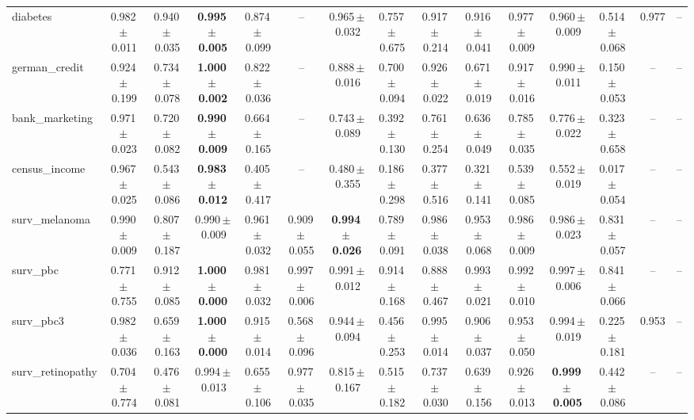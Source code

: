 \documentclass[8pt]{extarticle}
\begin{document}
\begin{longtable}{l*{14}{c}}
diabetes & 0.982\,$\pm$\,0.011 & 0.940\,$\pm$\,0.035 & \textbf{0.995\,$\pm$\,0.005} & 0.874\,$\pm$\,0.099 & -- & 0.965\,$\pm$\,0.032 & 0.757\,$\pm$\,0.675 & 0.917\,$\pm$\,0.214 & 0.916\,$\pm$\,0.041 & 0.977\,$\pm$\,0.009 & 0.960\,$\pm$\,0.009 & 0.514\,$\pm$\,0.068 & 0.977 & -- \\
german\_credit & 0.924\,$\pm$\,0.199 & 0.734\,$\pm$\,0.078 & \textbf{1.000\,$\pm$\,0.002} & 0.822\,$\pm$\,0.036 & -- & 0.888\,$\pm$\,0.016 & 0.700\,$\pm$\,0.094 & 0.926\,$\pm$\,0.022 & 0.671\,$\pm$\,0.019 & 0.917\,$\pm$\,0.016 & 0.990\,$\pm$\,0.011 & 0.150\,$\pm$\,0.053 & -- & -- \\
bank\_marketing & 0.971\,$\pm$\,0.023 & 0.720\,$\pm$\,0.082 & \textbf{0.990\,$\pm$\,0.009} & 0.664\,$\pm$\,0.165 & -- & 0.743\,$\pm$\,0.089 & 0.392\,$\pm$\,0.130 & 0.761\,$\pm$\,0.254 & 0.636\,$\pm$\,0.049 & 0.785\,$\pm$\,0.035 & 0.776\,$\pm$\,0.022 & 0.323\,$\pm$\,0.658 & -- & -- \\
census\_income & 0.967\,$\pm$\,0.025 & 0.543\,$\pm$\,0.086 & \textbf{0.983\,$\pm$\,0.012} & 0.405\,$\pm$\,0.417 & -- & 0.480\,$\pm$\,0.355 & 0.186\,$\pm$\,0.298 & 0.377\,$\pm$\,0.516 & 0.321\,$\pm$\,0.141 & 0.539\,$\pm$\,0.085 & 0.552\,$\pm$\,0.019 & 0.017\,$\pm$\,0.054 & -- & -- \\
surv\_melanoma & 0.990\,$\pm$\,0.009 & 0.807\,$\pm$\,0.187 & 0.990\,$\pm$\,0.009 & 0.961\,$\pm$\,0.032 & 0.909\,$\pm$\,0.055 & \textbf{0.994\,$\pm$\,0.026} & 0.789\,$\pm$\,0.091 & 0.986\,$\pm$\,0.038 & 0.953\,$\pm$\,0.068 & 0.986\,$\pm$\,0.009 & 0.986\,$\pm$\,0.023 & 0.831\,$\pm$\,0.057 & -- & -- \\
surv\_pbc & 0.771\,$\pm$\,0.755 & 0.912\,$\pm$\,0.085 & \textbf{1.000\,$\pm$\,0.000} & 0.981\,$\pm$\,0.032 & 0.997\,$\pm$\,0.006 & 0.991\,$\pm$\,0.012 & 0.914\,$\pm$\,0.168 & 0.888\,$\pm$\,0.467 & 0.993\,$\pm$\,0.021 & 0.992\,$\pm$\,0.010 & 0.997\,$\pm$\,0.006 & 0.841\,$\pm$\,0.066 & -- & -- \\
surv\_pbc3 & 0.982\,$\pm$\,0.036 & 0.659\,$\pm$\,0.163 & \textbf{1.000\,$\pm$\,0.000} & 0.915\,$\pm$\,0.014 & 0.568\,$\pm$\,0.096 & 0.944\,$\pm$\,0.094 & 0.456\,$\pm$\,0.253 & 0.995\,$\pm$\,0.014 & 0.906\,$\pm$\,0.037 & 0.953\,$\pm$\,0.050 & 0.994\,$\pm$\,0.019 & 0.225\,$\pm$\,0.181 & 0.953 & -- \\
surv\_retinopathy & 0.704\,$\pm$\,0.774 & 0.476\,$\pm$\,0.081 & 0.994\,$\pm$\,0.013 & 0.655\,$\pm$\,0.106 & 0.977\,$\pm$\,0.035 & 0.815\,$\pm$\,0.167 & 0.515\,$\pm$\,0.182 & 0.737\,$\pm$\,0.030 & 0.639\,$\pm$\,0.156 & 0.926\,$\pm$\,0.013 & \textbf{0.999\,$\pm$\,0.005} & 0.442\,$\pm$\,0.086 & -- & -- \\

\end{longtable}
\end{document}
